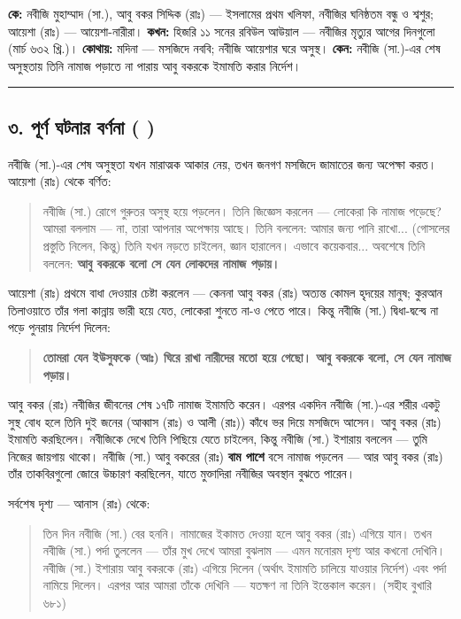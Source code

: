 \textbf{কে:} নবীজি মুহাম্মাদ (সা.), আবু বকর সিদ্দিক (রাঃ) — ইসলামের প্রথম খলিফা, নবীজির ঘনিষ্ঠতম বন্ধু ও শ্বশুর; আয়েশা (রাঃ) — আয়েশা-নারীরা।
\textbf{কখন:} হিজরি ১১ সনের রবিউল আউয়াল — নবীজির মৃত্যুর আগের দিনগুলো (মার্চ ৬৩২ খ্রি.)।
\textbf{কোথায়:} মদিনা — মসজিদে নববি; নবীজি আয়েশার ঘরে অসুস্থ।
\textbf{কেন:} নবীজি (সা.)-এর শেষ অসুস্থতায় তিনি নামাজ পড়াতে না পারায় আবু বকরকে ইমামতি করার নির্দেশ।

\medskip\hrule\medskip

\subsection*{৩. পূর্ণ ঘটনার বর্ণনা (  )}

নবীজি (সা.)-এর শেষ অসুস্থতা যখন মারাত্মক আকার নেয়, তখন জনগণ মসজিদে জামাতের জন্য অপেক্ষা করত। আয়েশা (রাঃ) থেকে বর্ণিত:

\begin{quote}
নবীজি (সা.) রোগে গুরুতর অসুস্থ হয়ে পড়লেন। তিনি জিজ্ঞেস করলেন — লোকেরা কি নামাজ পড়েছে? আমরা বললাম — না, তারা আপনার অপেক্ষায় আছে। তিনি বললেন: আমার জন্য পানি রাখো... (গোসলের প্রস্তুতি নিলেন, কিন্তু) তিনি যখন নড়তে চাইলেন, জ্ঞান হারালেন। এভাবে কয়েকবার... অবশেষে তিনি বললেন: \textbf{আবু বকরকে বলো সে যেন লোকদের নামাজ পড়ায়।}
\end{quote}

আয়েশা (রাঃ) প্রথমে বাধা দেওয়ার চেষ্টা করলেন — কেননা আবু বকর (রাঃ) অত্যন্ত কোমল হৃদয়ের মানুষ; কুরআন তিলাওয়াতে তাঁর গলা কান্নায় ভারী হয়ে যেত, লোকেরা শুনতে না-ও পেতে পারে। কিন্তু নবীজি (সা.) দ্বিধা-দ্বন্দ্বে না পড়ে পুনরায় নির্দেশ দিলেন:

\begin{quote}
\textbf{তোমরা যেন ইউসুফকে (আঃ) ঘিরে রাখা নারীদের মতো হয়ে গেছো। আবু বকরকে বলো, সে যেন নামাজ পড়ায়।}
\end{quote}

আবু বকর (রাঃ) নবীজির জীবনের শেষ ১৭টি নামাজ ইমামতি করেন। এরপর একদিন নবীজি (সা.)-এর শরীর একটু সুস্থ বোধ হলে তিনি দুই জনের (আব্বাস (রাঃ) ও আলী (রাঃ)) কাঁধে ভর দিয়ে মসজিদে আসেন। আবু বকর (রাঃ) ইমামতি করছিলেন। নবীজিকে দেখে তিনি পিছিয়ে যেতে চাইলেন, কিন্তু নবীজি (সা.) ইশারায় বললেন — তুমি নিজের জায়গায় থাকো। নবীজি (সা.) আবু বকরের (রাঃ) \textbf{বাম পাশে} বসে নামাজ পড়লেন — আর আবু বকর (রাঃ) তাঁর তাকবিরগুলো জোরে উচ্চারণ করছিলেন, যাতে মুক্তাদিরা নবীজির অবস্থান বুঝতে পারেন।

সর্বশেষ দৃশ্য — আনাস (রাঃ) থেকে:

\begin{quote}
তিন দিন নবীজি (সা.) বের হননি। নামাজের ইকামত দেওয়া হলে আবু বকর (রাঃ) এগিয়ে যান। তখন নবীজি (সা.) পর্দা তুললেন — তাঁর মুখ দেখে আমরা বুঝলাম — এমন মনোরম দৃশ্য আর কখনো দেখিনি। নবীজি (সা.) ইশারায় আবু বকরকে (রাঃ) এগিয়ে দিলেন (অর্থাৎ ইমামতি চালিয়ে যাওয়ার নির্দেশ) এবং পর্দা নামিয়ে দিলেন। এরপর আর আমরা তাঁকে দেখিনি — যতক্ষণ না তিনি ইন্তেকাল করেন। (সহীহ বুখারি ৬৮১)
\end{quote}

